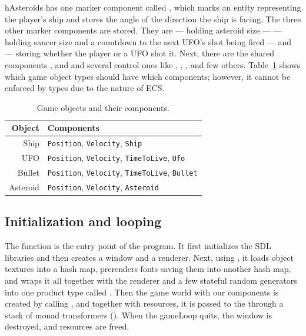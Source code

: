 \documentclass[
  digital, %
  color,   %
  table,   %
  oneside, %
  lof,     %
  lot,     %
]{fithesis3}
\begin{document}
hAsteroids has one  marker component called ,
which marks an entity representing the player's ship and stores
the angle of the direction the ship is facing. The three other marker
components are  stored. They are  — holding
asteroid size —  — holding saucer size and a countdown
to the next UFO's shot being fired — and  — storing whether
the player or a UFO shot it. Next, there are the shared components
,  and 
and several  control ones like ,
, ,  and few others.
Table~\ref{tab:entities} shows which game object types should have which components;
however, it cannot be enforced by types due to the nature of ECS.

\begin{table}[hbt]
  \begin{tabularx}{\textwidth}{|r|X|}
    \toprule
    Object & Components \\
    \midrule
    Ship     & \texttt{Position}, \texttt{Velocity}, \texttt{Ship} \\
    UFO      & \texttt{Position}, \texttt{Velocity}, \texttt{TimeToLive}, \texttt{Ufo} \\
    Bullet   & \texttt{Position}, \texttt{Velocity}, \texttt{TimeToLive}, \texttt{Bullet} \\
    Asteroid & \texttt{Position}, \texttt{Velocity}, \texttt{Asteroid} \\
    \bottomrule
  \end{tabularx}
  \caption{Game objects and their components.}
  \label{tab:entities}
\end{table}


\subsection{Initialization and looping}
\label{sect:initialization}
The  function is the entry point of the program. It first initializes
the SDL libraries and then creates a window and a renderer. Next, using ,
it loads object textures into a hash map, prerenders fonts saving them into another
hash map, and wraps it all together with the renderer and a few stateful random generators
into one product type called . Then the game world with our
components is created by calling , and together with resources,
it is passed to the  through a stack
of monad transformers (). When the gameLoop quits,
the window is destroyed, and resources are freed.
\end{document}
